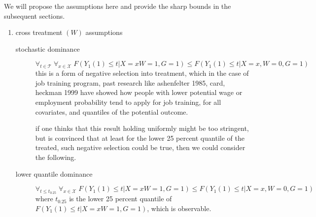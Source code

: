 \documentclass[uplatex,dvipdfmx]{jsarticle}
\begin{document}
We will propose the assumptions here and provide the sharp bounds in the subsequent sections.
\begin{enumerate}[(1)]
     \item cross treatment $(W)$ assumptions
        \begin{description}
            \item[stochastic dominance] \[\forall_{t\in\mathcal{T}}\;\forall_{x\in\mathcal{X}}\;F(Y_1(1) \leq t |X=x W=1, G=1 )\leq F(Y_1(1) \leq t |X=x ,W= 0, G=1)\]
            this is a form of negative selection into treatment, which in the case of job training program, past research like %
            {ashenfelter 1985, card, heckman 1999} have showed how people with lower potential wage or employment probability tend to apply for job training, for all covariates, and quantiles of the potential outcome.

            if one thinks that this result holding uniformly might be too stringent, but is convinced that at least for the lower 25 percent quantile of the treated, such negative selection could be true, then we could consider the following.
            \item[lower quantile dominance] \[\forall_{t \leq t_{0.25}}\;\forall_{x\in\mathcal{X}}\;F(Y_1(1) \leq t |X=x W=1, G=1 )\leq F(Y_1(1) \leq t |X=x ,W= 0, G=1)\]
            where $t_{0.25}$ is the lower 25 percent quantile of $ F(Y_1(1) \leq t |X=x W=1, G=1 )$, which is observable. 


\end{description}
\end{enumerate}
\end{document}
